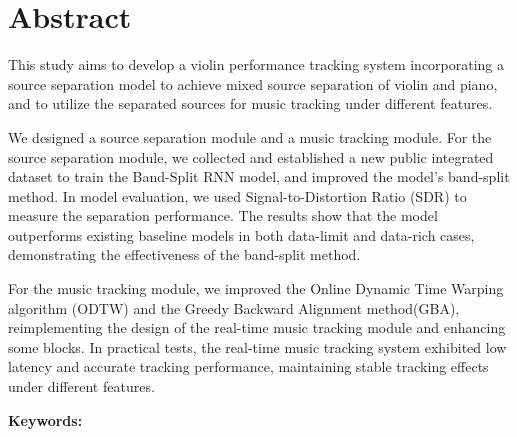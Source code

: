 \documentclass[class=NCU_thesis, crop=false]{standalone}
\begin{document}
\chapter{Abstract}

This study aims to develop a violin performance tracking system 
incorporating a source separation model to achieve mixed source separation 
of violin and piano, 
and to utilize the separated sources for music tracking under different features.

We designed a source separation module and a music tracking module. 
For the source separation module, 
we collected and established a new public integrated dataset to train the Band-Split RNN model, 
and improved the model's band-split method. 
In model evaluation, we used Signal-to-Distortion Ratio (SDR) 
to measure the separation performance.
The results show that the model outperforms existing baseline models 
in both data-limit and data-rich cases, 
demonstrating the effectiveness of the band-split method.

For the music tracking module, 
we improved the Online Dynamic Time Warping algorithm (ODTW) and 
the Greedy Backward Alignment method(GBA), 
reimplementing the design of the real-time music tracking module and 
enhancing some blocks. 
In practical tests, the real-time music tracking system exhibited 
low latency and accurate tracking performance, 
maintaining stable tracking effects under different features.

\vspace{2em}
\noindent \textbf{Keywords:} \keywordsEn{} %
\end{document}
